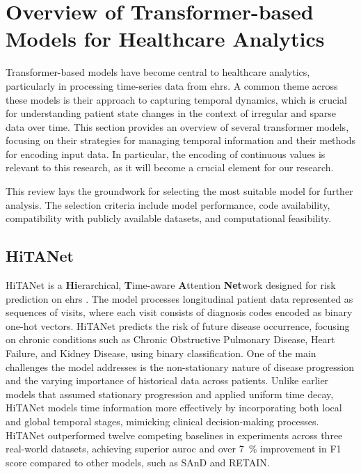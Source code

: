 \section{Overview of Transformer-based Models for Healthcare Analytics}

Transformer-based models have become central to healthcare analytics, particularly in processing time-series data from \glspl{ehr}. A common theme across these models is their approach to capturing temporal dynamics, which is crucial for understanding patient state changes in the context of irregular and sparse data over time. This section provides an overview of several transformer models, focusing on their strategies for managing temporal information and their methods for encoding input data. In particular, the encoding of continuous values is relevant to this research, as it will become a crucial element for our research.

This review lays the groundwork for selecting the most suitable model for further analysis. The selection criteria include model performance, code availability, compatibility with publicly available datasets, and computational feasibility.


\subsection{HiTANet}

HiTANet is a \textbf{Hi}erarchical, \textbf{T}ime-aware \textbf{A}ttention \textbf{Net}work designed for risk prediction on \glspl{ehr} \cite{HiTANet2020}. The model processes longitudinal patient data represented as sequences of visits, where each visit consists of diagnosis codes encoded as binary one-hot vectors. HiTANet predicts the risk of future disease occurrence, focusing on chronic conditions such as Chronic Obstructive Pulmonary Disease, Heart Failure, and Kidney Disease, using binary classification. One of the main challenges the model addresses is the non-stationary nature of disease progression and the varying importance of historical data across patients. Unlike earlier models that assumed stationary progression and applied uniform time decay, HiTANet models time information more effectively by incorporating both local and global temporal stages, mimicking clinical decision-making processes. HiTANet outperformed twelve competing baselines in experiments across three real-world datasets, achieving superior \gls{auroc} and over \qty{7}{\percent} improvement in F1 score compared to other models, such as SAnD and RETAIN.

